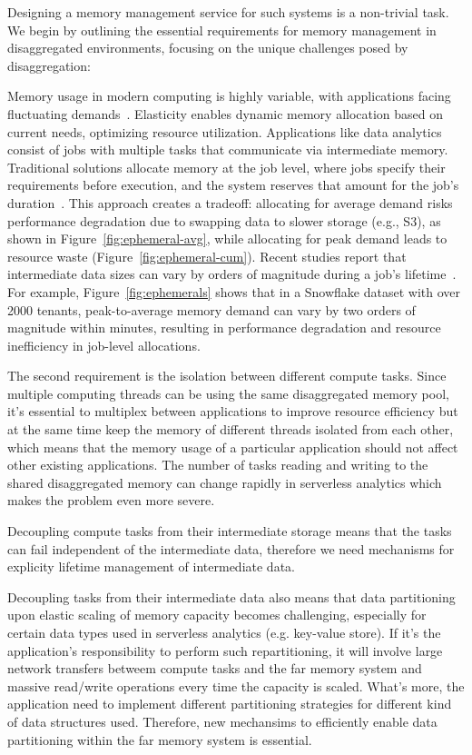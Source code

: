 Designing a memory management service for such systems is a non-trivial task. We begin by outlining the essential requirements for memory management in disaggregated environments, focusing on the unique challenges posed by disaggregation:

  Memory usage in modern computing is highly variable, with applications facing fluctuating demands~\cite{jiffy}. Elasticity enables dynamic memory allocation based on current needs, optimizing resource utilization. Applications like data analytics consist of jobs with multiple tasks that communicate via intermediate memory. Traditional solutions allocate memory at the job level, where jobs specify their requirements before execution, and the system reserves that amount for the job's duration~\cite{pocket}. This approach creates a tradeoff: allocating for average demand risks performance degradation due to swapping data to slower storage (e.g., S3), as shown in Figure~\ref{fig:ephemeral-avg}, while allocating for peak demand leads to resource waste (Figure~\ref{fig:ephemeral-cum}). Recent studies report that intermediate data sizes can vary by orders of magnitude during a job's lifetime~\cite{snowset}. For example, Figure~\ref{fig:ephemerals} shows that in a Snowflake dataset with over 2000 tenants, peak-to-average memory demand can vary by two orders of magnitude within minutes, resulting in performance degradation and resource inefficiency in job-level allocations.

 The second requirement is the isolation between different compute tasks. Since multiple computing threads can be using the same disaggregated memory pool, it's essential to multiplex between applications to improve resource efficiency but at the same time keep the memory of different threads isolated from each other, which means that the memory usage of a particular application should not affect other existing applications. The number of tasks reading and writing to the shared disaggregated memory can change rapidly in serverless analytics which makes the problem even more severe.

Decoupling compute tasks from their intermediate storage means that the tasks can fail independent of the intermediate data, therefore we need mechanisms for explicity lifetime management of intermediate data.

Decoupling tasks from their intermediate data also means that data partitioning upon elastic scaling of memory capacity becomes challenging, especially for certain data types used in serverless analytics (e.g. key-value store). If it's the application's responsibility to perform such repartitioning, it will involve large network transfers betweem compute tasks and the far memory system and massive read/write operations every time the capacity is scaled. What's more, the application need to implement different partitioning strategies for different kind of data structures used. Therefore, new mechansims to efficiently enable data partitioning within the far memory system is essential.


